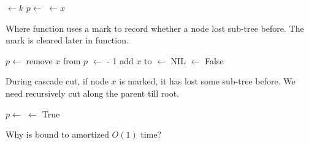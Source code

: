 \documentclass[b5paper]{article}
\begin{document}
\begin{algorithmic}[1]
  \State {} $\gets k$
  \State $p \gets $ 
    \State {}
    \State {}
  \EndIf
    \State {} $\gets x$
  \EndIf
\EndFunction
\end{algorithmic}

Where function  uses a mark to record whether a node lost sub-tree before. The mark is cleared later in  function.

\begin{algorithmic}[1]
  \State $p \gets $ 
  \State remove $x$ from $p$
  \State {} $\gets$  - 1
  \State add $x$ to 
  \State {} $\gets$ NIL
  \State {} $\gets$ False
\EndFunction
\end{algorithmic}

During cascade cut, if node $x$ is marked, it has lost some sub-tree before. We need recursively cut along the parent till root.

\begin{algorithmic}[1]
  \State $p \gets $ 
      \State {} $\gets$ True
    \Else
      \State {}
      \State {}
    \EndIf
  \EndIf
\EndFunction
\end{algorithmic}

\begin{Exercise}\label{ex:fibo-heap-decrease}
Why is  bound to amortized $O(1)$ time?
\end{Exercise}
\end{document}
